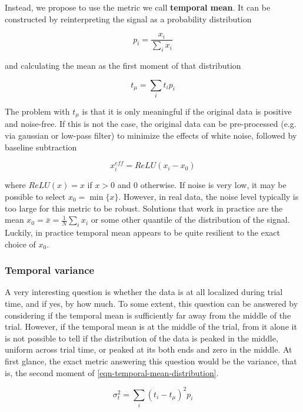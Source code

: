 \documentclass[a4paper,10pt]{article}
\begin{document}
Instead, we propose to use the metric we call \textbf{temporal mean}. It can be 
constructed by reinterpreting the signal as a probability distribution

\begin{equation}
    \label{eqn-temporal-mean-distribution}
    p_i = \frac{x_i}{\sum_i x_i}
\end{equation}

and calculating the mean as the first moment of that distribution

\begin{equation}
    t_{\mu} = \sum_i t_i p_i
\end{equation}

The problem with $t_{\mu}$ is that it is only meaningful if the 
original data is positive and noise-free. If this is not the case, the original 
data can be pre-processed (e.g. via gaussian or low-pass filter) to minimize 
the effects of white noise, followed by baseline subtraction

$$x^{eff}_i = ReLU(x_i - x_0)$$

where $ReLU(x) = x$ if $x > 0$ and $0$ otherwise. If noise is very low, it may 
be possible to select $x_0 = \min\{x\}$. However, in real data, the noise level 
typically is too large for this metric to be robust. Solutions that work in 
practice are the mean $x_0 = \bar{x} = \frac{1}{N}\sum_i x_i$ or some other 
quantile of the distribution of the signal. Luckily, in practice temporal mean 
appears to be quite resilient to the exact choice of $x_0$.

\subsubsection{Temporal variance}

A very interesting question is whether the data is at all localized during
trial time, and if yes, by how much. To some extent, this question can be 
answered by considering if the temporal mean is sufficiently far away from the 
middle of the trial. However, if the temporal mean is at the middle of the 
trial, from it alone it is not possible to tell if the distribution of the data 
is peaked in the middle, uniform across trial time, or peaked at its both ends 
and zero in the middle. At first glance, the exact metric answering this 
question would be the variance, that is, the second moment of 
\cref{eqn-temporal-mean-distribution}.

\begin{equation}
    \sigma^2_{t} = \sum_i (t_i - t_{\mu})^2 p_i
\end{equation}
\end{document}
